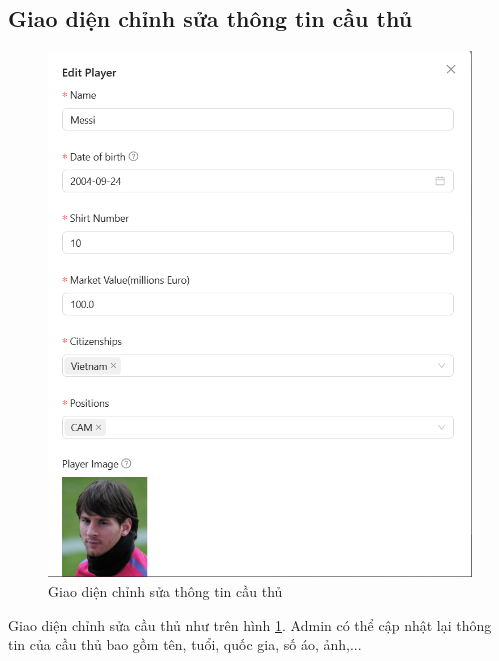 \documentclass[../BTL.tex]{subfiles}
\begin{document}
\subsection{Giao diện chỉnh sửa thông tin cầu thủ}
\begin{figure}
    \centering
    \includegraphics[width=1\linewidth]{Hinhve/admin_edit_player.png}
    \caption{Giao diện chỉnh sửa thông tin cầu thủ}
    \label{fig:admin_edit_player}
\end{figure}
Giao diện chỉnh sửa cầu thủ như trên hình \ref{fig:admin_edit_player}. Admin có thể cập nhật lại thông tin của cầu thủ bao gồm tên, tuổi, quốc gia, số áo, ảnh,...
\end{document}
